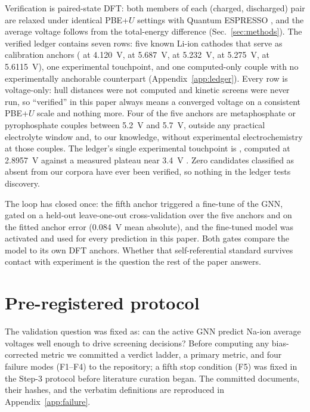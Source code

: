 \documentclass[reprint,aps,prb,amsmath,amssymb,nofootinbib,longbibliography]{revtex4-2}
\begin{document}
Verification is paired-state DFT: both members of each (charged, discharged)
pair are relaxed under identical PBE+$U$ settings with Quantum ESPRESSO
\cite{giannozzi2009,giannozzi2017}, and the average voltage follows from the
total-energy difference (Sec.~\ref{sec:methods}). The verified ledger
contains seven rows: five known Li-ion cathodes that serve as calibration
anchors ( at \SI{4.120}{\volt},  at
\SI{5.687}{\volt},  at \SI{5.232}{\volt},  at
\SI{5.275}{\volt},  at \SI{5.6115}{\volt}), one experimental
touchpoint, and one computed-only couple with no experimentally anchorable
counterpart (Appendix~\ref{app:ledger}). Every row is voltage-only: hull
distances were not computed and kinetic screens were never run, so
``verified'' in this paper always means a converged voltage on a consistent
PBE+$U$ scale and nothing more. Four of the five anchors are
metaphosphate or pyrophosphate couples between \SI{5.2}{\volt} and
\SI{5.7}{\volt}, outside any practical electrolyte window and, to our
knowledge, without experimental electrochemistry at those couples. The
ledger's single experimental touchpoint is , computed at
\SI{2.8957}{\volt} against a measured plateau near \SI{3.4}{\volt}
\cite{jian2012}. Zero candidates classified as absent from our corpora
have ever been verified, so nothing in the ledger tests discovery.

The loop has closed once: the fifth anchor triggered a fine-tune of the GNN,
gated on a held-out leave-one-out cross-validation over the five anchors and
on the fitted anchor error (\SI{0.084}{\volt} mean absolute), and the
fine-tuned model was activated and used for every prediction in this paper.
Both gates compare the model to its own DFT anchors. Whether that
self-referential standard survives contact with experiment is the question
the rest of the paper answers.

\section{Pre-registered protocol}
\label{sec:protocol}

The validation question was fixed as: can the active GNN predict Na-ion
average voltages well enough to drive screening decisions? Before computing
any bias-corrected metric we committed a verdict ladder, a primary metric, and
four failure modes (F1--F4) to the repository; a fifth stop condition (F5) was
fixed in the Step-3 protocol before literature curation began. The committed
documents, their hashes, and the verbatim definitions are reproduced in
Appendix~\ref{app:failure}.
\end{document}
